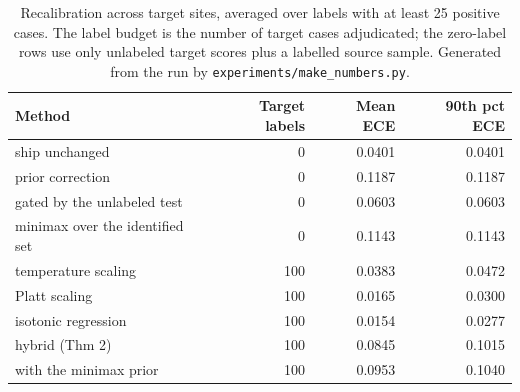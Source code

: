 \begin{table}[t]
\centering\small
\begin{tabular}{lrrr}
\toprule
Method & Target labels & Mean ECE & 90th pct ECE \\
\midrule
ship unchanged & 0 & 0.0401 & 0.0401 \\
prior correction & 0 & 0.1187 & 0.1187 \\
\quad gated by the unlabeled test & 0 & 0.0603 & 0.0603 \\
\quad minimax over the identified set & 0 & 0.1143 & 0.1143 \\
temperature scaling & 100 & 0.0383 & 0.0472 \\
Platt scaling & 100 & 0.0165 & 0.0300 \\
isotonic regression & 100 & 0.0154 & 0.0277 \\
hybrid (Thm 2) & 100 & 0.0845 & 0.1015 \\
\quad with the minimax prior & 100 & 0.0953 & 0.1040 \\
\bottomrule
\end{tabular}
\caption{Recalibration across target sites, averaged over labels with at least
25 positive cases. The label budget is the number of target cases adjudicated;
the zero-label rows use only unlabeled target scores plus a labelled source
sample. Generated from the run by \texttt{experiments/make\_numbers.py}.}
\label{tab:recal}
\end{table}
